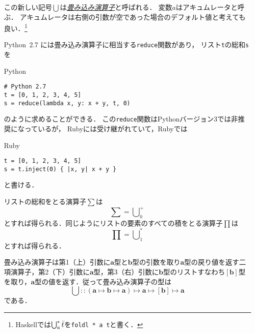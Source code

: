 \documentclass[a5paper,draft]{jsbook}
\newcommand{\programminglanguage}[1]{\textsf{#1}}
\newcommand{\haskell}{\programminglanguage{Haskell}}
\newcommand{\python}{\programminglanguage{Python}}
\newcommand{\keyword}[1]{{\underline{\emph{#1}}}}
\newcommand{\code}[1]{\texttt{#1}}
\newenvironment{pythoncode}{\begin{itembox}[r]{\python}}{\end{itembox}}
\newenvironment{rubycode}{\begin{itembox}[r]{Ruby}}{\end{itembox}}
\newcommand{\mathTypeParameter}[1]{\mathbf{#1}}
\newcommand{\mathListVar}[1]{\Bar{#1}}
\newcommand{\mathListType}[1]{\left[#1\right]}
\DeclareMathOperator*{\mathFold}{\bigcup}
\newcommand{\mathIn}{\mathrel{::}}
\newcommand{\mathMapsTo}{\mapsto}
\newcommand{\mathMorphII}[3]{#1\mathMapsTo#2\mathMapsTo#3}
\newcommand{\mathMorphIII}[4]{#1\mathMapsTo#2\mathMapsTo#3\mathMapsTo#4}
\begin{document}
この新しい記号$\mathFold$は\keyword{畳み込み演算子}と呼ばれる．
変数$a$はアキュムレータと呼ぶ．
アキュムレータは右側の引数が空であった場合のデフォルト値と考えても良い．\footnote{\haskell では$\mathFold^{*}_{a}\mathListVar{t}$を\code{foldl * a t}と書く．}

\python\ 2.7 には畳み込み演算子に相当する\code{reduce}関数があり，
リスト\code{t}の総和\code{s}を
\begin{pythoncode}
\begin{verbatim}
# Python 2.7
t = [0, 1, 2, 3, 4, 5]
s = reduce(lambda x, y: x + y, t, 0)
\end{verbatim}
\end{pythoncode}
のように求めることができる．
この\code{reduce}関数は\python バージョン3では非推奨になっているが，
Rubyには受け継がれていて，Rubyでは
\begin{rubycode}
\begin{verbatim}
t = [0, 1, 2, 3, 4, 5]
s = t.inject(0) { |x, y| x + y }
\end{verbatim}
\end{rubycode}
と書ける．

リストの総和をとる演算子$\sum$は
\begin{equation}
\sum=\mathFold^+_0
\end{equation}
とすれば得られる．同じようにリストの要素のすべての積をとる演算子$\prod$は
\begin{equation}
\prod=\mathFold^*_1
\end{equation}
とすれば得られる．

畳み込み演算子は第1（上）引数に$\mathTypeParameter{a}$型と$\mathTypeParameter{b}$型の引数を取り$\mathTypeParameter{a}$型の戻り値を返す二項演算子，第2（下）引数に$\mathTypeParameter{a}$型，第3（右）引数に$\mathTypeParameter{b}$型のリストすなわち$\mathListType{\mathTypeParameter{b}}$型を取り，$\mathTypeParameter{a}$型の値を返す．従って畳み込み演算子の型は
\begin{equation}
\mathFold\mathIn\mathMorphIII{(\mathMorphII{\mathTypeParameter{a}}{\mathTypeParameter{b}}{\mathTypeParameter{a}})}{\mathTypeParameter{a}}{\mathListType{\mathTypeParameter{b}}}{\mathTypeParameter{a}}
\end{equation}
である．
\end{document}
